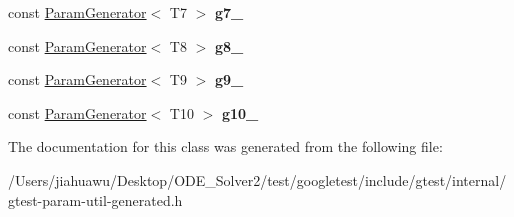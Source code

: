 \begin{DoxyCompactItemize}
const \mbox{\hyperlink{classtesting_1_1internal_1_1_param_generator}{Param\+Generator}}$<$ T7 $>$ {\bfseries g7\+\_\+}
\item 
\mbox{\label{classtesting_1_1internal_1_1_cartesian_product_generator10_a9f76ec8d21d175b1cf85099d548cb456}} 
const \mbox{\hyperlink{classtesting_1_1internal_1_1_param_generator}{Param\+Generator}}$<$ T8 $>$ {\bfseries g8\+\_\+}
\item 
\mbox{\label{classtesting_1_1internal_1_1_cartesian_product_generator10_a0bf21ea47112277221eb91fd19d84512}} 
const \mbox{\hyperlink{classtesting_1_1internal_1_1_param_generator}{Param\+Generator}}$<$ T9 $>$ {\bfseries g9\+\_\+}
\item 
\mbox{\label{classtesting_1_1internal_1_1_cartesian_product_generator10_a1ecc9d1a94a68269677f293d38a99333}} 
const \mbox{\hyperlink{classtesting_1_1internal_1_1_param_generator}{Param\+Generator}}$<$ T10 $>$ {\bfseries g10\+\_\+}
\end{DoxyCompactItemize}


The documentation for this class was generated from the following file\+:\begin{DoxyCompactItemize}
\item 
/\+Users/jiahuawu/\+Desktop/\+O\+D\+E\+\_\+\+Solver2/test/googletest/include/gtest/internal/gtest-\/param-\/util-\/generated.\+h\end{DoxyCompactItemize}
